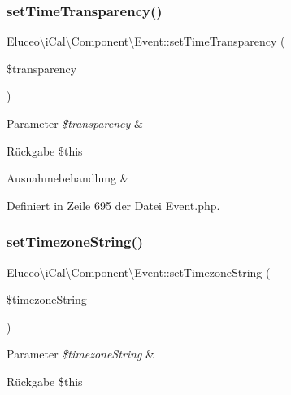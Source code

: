 \subsubsection{\texorpdfstring{set\+Time\+Transparency()}{setTimeTransparency()}\hspace{0.1cm}{\footnotesize\ttfamily [3/3]}}
{\footnotesize\ttfamily Eluceo\textbackslash{}i\+Cal\textbackslash{}\+Component\textbackslash{}\+Event\+::set\+Time\+Transparency (\begin{DoxyParamCaption}\item[{}]{\$transparency }\end{DoxyParamCaption})}


\begin{DoxyParams}{Parameter}
{\em \$transparency} & \\
\hline
\end{DoxyParams}
\begin{DoxyReturn}{Rückgabe}
\$this
\end{DoxyReturn}

\begin{DoxyExceptions}{Ausnahmebehandlung}
{\em } & \\
\hline
\end{DoxyExceptions}


Definiert in Zeile 695 der Datei Event.\+php.

\mbox{\label{class_eluceo_1_1i_cal_1_1_component_1_1_event_aad35266e1a18bcc58e56980ded6dddb6}} 
\subsubsection{\texorpdfstring{set\+Timezone\+String()}{setTimezoneString()}\hspace{0.1cm}{\footnotesize\ttfamily [1/3]}}
{\footnotesize\ttfamily Eluceo\textbackslash{}i\+Cal\textbackslash{}\+Component\textbackslash{}\+Event\+::set\+Timezone\+String (\begin{DoxyParamCaption}\item[{}]{\$timezone\+String }\end{DoxyParamCaption})}


\begin{DoxyParams}{Parameter}
{\em \$timezone\+String} & \\
\hline
\end{DoxyParams}
\begin{DoxyReturn}{Rückgabe}
\$this 
\end{DoxyReturn}


